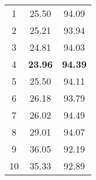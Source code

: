 \documentclass{article} \usepackage{iclr2022_conference,times}
\begin{document}
\begin{table}[t]
{{\begin{tabular}{c|cc}
1               & 25.50                  & 94.09                  \\
2               & 25.21                  & 93.94                  \\
3               & 24.81                  & 94.03                  \\
\cellcolor{greyL}4               & \cellcolor{greyL}\textbf{23.96}                  & \cellcolor{greyL}\textbf{94.39}                  \\
5               & 25.50                  & 94.11                  \\
6               & 26.18                  & 93.79                  \\
7               & 26.02                  & 94.49                  \\
8               & 29.01                  & 94.07                  \\
9               & 36.05                  & 92.19                  \\
10              & 35.33                  & 92.89                  \\
\bottomrule[1.5pt]      
\end{tabular}
}}
\end{table}
\end{document}
